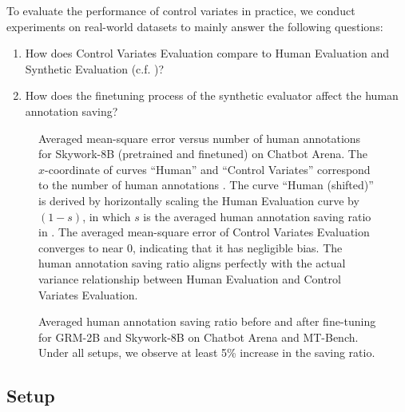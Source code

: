 To evaluate the performance of control variates in practice, we conduct experiments on real-world datasets to mainly answer the following questions:
\begin{enumerate}[topsep=0pt,itemsep=-1ex,partopsep=1ex,parsep=1ex]
    \item How does Control Variates Evaluation compare to Human Evaluation and Synthetic Evaluation (c.f. )?
    \item How does the finetuning process of the synthetic evaluator affect the human annotation saving?
\end{enumerate}

\begin{figure*}[ht]
    \centering
    \caption{Averaged mean-square error versus number of human annotations for Skywork-8B (pretrained and finetuned) on Chatbot Arena. The $x$-coordinate of curves ``Human'' and ``Control Variates'' correspond to the number of human annotations \citep{zheng2023judging}. The curve ``Human (shifted)'' is derived by horizontally scaling the Human Evaluation curve by $(1-s)$, in which $s$ is the averaged human annotation saving ratio in . The averaged mean-square error of Control Variates Evaluation converges to near 0, indicating that it has negligible bias. The human annotation saving ratio aligns perfectly with the actual variance relationship between Human Evaluation and Control Variates Evaluation. }
    \label{fig:bootstrap}
\end{figure*}

\begin{figure}[ht]
    \centering
    \hfill
    \caption{Averaged human annotation saving ratio before and after fine-tuning for GRM-2B and Skywork-8B on Chatbot Arena and MT-Bench. Under all setups, we observe at least 5\% increase in the saving ratio.}
    \label{fig:pretrain_finetune}
\end{figure}

\subsection{Setup}
\label{sec:exp_setup}
